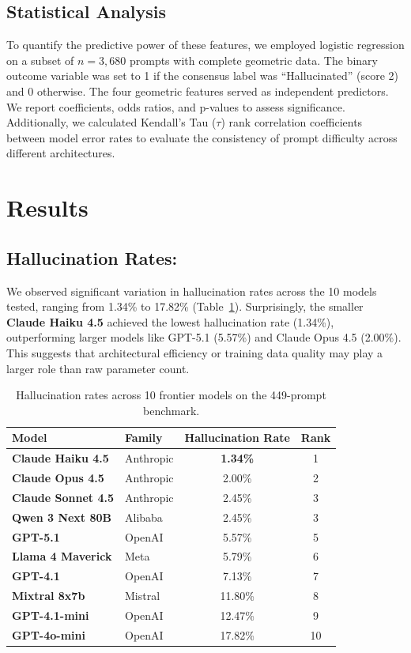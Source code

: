 \documentclass{article}
\begin{document}
\subsection{Statistical Analysis}
To quantify the predictive power of these features, we employed logistic regression on a subset of $n=3,680$ prompts with complete geometric data. The binary outcome variable was set to 1 if the consensus label was ``Hallucinated'' (score 2) and 0 otherwise. The four geometric features served as independent predictors. We report coefficients, odds ratios, and p-values to assess significance. Additionally, we calculated Kendall's Tau ($\tau$) rank correlation coefficients between model error rates to evaluate the consistency of prompt difficulty across different architectures.



\section{Results}

\subsection{Hallucination Rates:}
We observed significant variation in hallucination rates across the 10 models tested, ranging from 1.34\% to 17.82\% (Table~\ref{tab:hallucination-rates}). Surprisingly, the smaller \textbf{Claude Haiku 4.5} achieved the lowest hallucination rate (1.34\%), outperforming larger models like GPT-5.1 (5.57\%) and Claude Opus 4.5 (2.00\%). This suggests that architectural efficiency or training data quality may play a larger role than raw parameter count.

\begin{table}[h]
    \centering
    \begin{tabular}{llcc}
        \toprule
        \textbf{Model} & \textbf{Family} & \textbf{Hallucination Rate} & \textbf{Rank} \\
        \midrule
        \textbf{Claude Haiku 4.5} & Anthropic & \textbf{1.34\%} & 1 \\
        \textbf{Claude Opus 4.5} & Anthropic & 2.00\% & 2 \\
        \textbf{Claude Sonnet 4.5} & Anthropic & 2.45\% & 3 \\
        \textbf{Qwen 3 Next 80B} & Alibaba & 2.45\% & 3 \\
        \textbf{GPT-5.1} & OpenAI & 5.57\% & 5 \\
        \textbf{Llama 4 Maverick} & Meta & 5.79\% & 6 \\
        \textbf{GPT-4.1} & OpenAI & 7.13\% & 7 \\
        \textbf{Mixtral 8x7b} & Mistral & 11.80\% & 8 \\
        \textbf{GPT-4.1-mini} & OpenAI & 12.47\% & 9 \\
        \textbf{GPT-4o-mini} & OpenAI & 17.82\% & 10 \\
        \bottomrule
    \end{tabular}
    \caption{Hallucination rates across 10 frontier models on the 449-prompt benchmark.}
    \label{tab:hallucination-rates}
\end{table}
\end{document}
